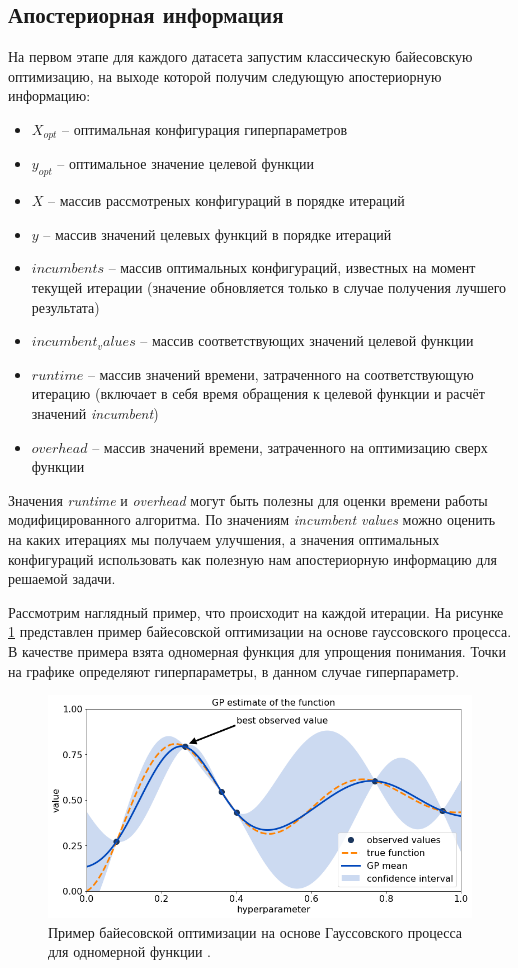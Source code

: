 \documentclass[times,specification,annotation]{itmo-student-thesis}
\begin{document}
	\subsection{Апостериорная информация} 
	На первом этапе для каждого датасета запустим классическую байесовскую оптимизацию, на выходе которой получим следующую апостериорную информацию: 
	\begin{itemize}
		\item $ X_{opt} $ -- оптимальная конфигурация гиперпараметров
		\item $ y_{opt} $ -- оптимальное значение целевой функции
		\item $ X $ -- массив рассмотреных конфигураций в порядке итераций
		\item $ y $ -- массив значений целевых функций в порядке итераций
		\item $ incumbents $ -- массив оптимальных конфигураций, известных на момент текущей итерации (значение обновляется только в случае получения лучшего результата)
		\item $ incumbent_values $ -- массив соответствующих значений целевой функции
		\item $ runtime $ -- массив значений времени, затраченного на соответствующую итерацию (включает в себя время обращения к целевой функции и расчёт значений \textit{incumbent})
		\item $ overhead $ -- массив значений времени, затраченного на оптимизацию сверх функции
	\end{itemize}
	Значения \textit{runtime} и \textit{overhead} могут быть полезны для оценки времени работы модифицированного алгоритма. По значениям \textit{incumbent values} можно оценить на каких итерациях мы получаем улучшения, а значения оптимальных конфигураций использовать как полезную нам апостериорную информацию для решаемой задачи. \par 
	Рассмотрим наглядный пример, что происходит на каждой итерации. На рисунке \ref{img:bogp} представлен пример байесовской оптимизации на основе гауссовского процесса. В качестве примера взята одномерная функция для упрощения понимания. Точки на графике определяют гиперпараметры, в данном случае гиперпараметр. 
	\begin{figure}[!ht]
		\caption{Пример байесовской оптимизации на основе Гауссовского процесса для одномерной функции \cite{kiss2019bayesian}.}\label{img:bogp}
		\includegraphics[width=0.85\linewidth]{bo_gp}
		\centering
	\end{figure}
\end{document}
